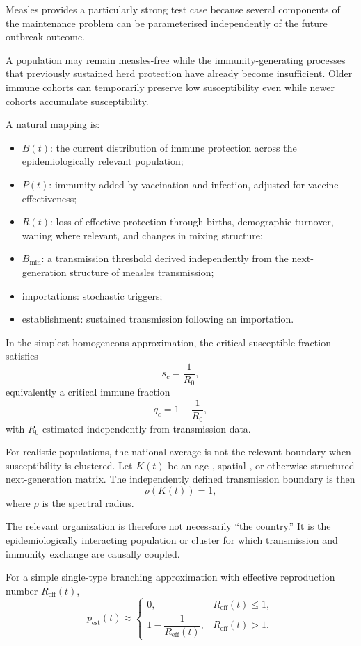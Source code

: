 \documentclass[11pt,a4paper]{article}
\begin{document}
Measles provides a particularly strong test case because several components of the maintenance problem can be parameterised independently of the future outbreak outcome.

A population may remain measles-free while the immunity-generating processes that previously sustained herd protection have already become insufficient. Older immune cohorts can temporarily preserve low susceptibility even while newer cohorts accumulate susceptibility.

A natural mapping is:
\begin{itemize}[nosep]
    \item $B(t)$: the current distribution of immune protection across the epidemiologically relevant population;
    \item $P(t)$: immunity added by vaccination and infection, adjusted for vaccine effectiveness;
    \item $R(t)$: loss of effective protection through births, demographic turnover, waning where relevant, and changes in mixing structure;
    \item $B_{\min}$: a transmission threshold derived independently from the next-generation structure of measles transmission;
    \item importations: stochastic triggers;
    \item establishment: sustained transmission following an importation.
\end{itemize}

In the simplest homogeneous approximation, the critical susceptible fraction satisfies
\[
s_c=\frac{1}{R_0},
\]
equivalently a critical immune fraction
\[
q_c=1-\frac{1}{R_0},
\]
with $R_0$ estimated independently from transmission data.

For realistic populations, the national average is not the relevant boundary when susceptibility is clustered. Let $K(t)$ be an age-, spatial-, or otherwise structured next-generation matrix. The independently defined transmission boundary is then
\begin{equation}
\boxed{
\rho(K(t))=1,
}
\label{eq:measles-threshold}
\end{equation}
where $\rho$ is the spectral radius.

The relevant organization is therefore not necessarily ``the country.'' It is the epidemiologically interacting population or cluster for which transmission and immunity exchange are causally coupled.

For a simple single-type branching approximation with effective reproduction number $R_{\mathrm{eff}}(t)$,
\begin{equation}
p_{\mathrm{est}}(t)
\approx
\begin{cases}
0, & R_{\mathrm{eff}}(t)\le1,\\[4pt]
1-\dfrac{1}{R_{\mathrm{eff}}(t)}, & R_{\mathrm{eff}}(t)>1.
\end{cases}
\label{eq:branching-establishment}
\end{equation}
\end{document}
